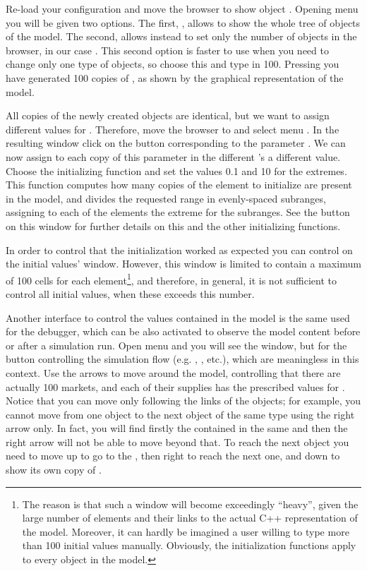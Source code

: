 \documentclass [11pt,a4paper] {book}
\def\LsD{{L\kern-.2337em\lower-.58ex\hbox{S}\kern-.181em\lower-.2ex\hbox{D}}\xspace}
\begin{document}
Re-load your configuration and move the browser to show object . Opening menu  you will be given two options. The first, , allows to show the whole tree of objects of the model. The second,  allows instead to set only the number of objects in the browser, in our case . This second option is faster to use when you need to change only one type of objects, so choose this and type in 100. Pressing  you have generated 100 copies of , as shown by the \menu{\LsD Model Structure} graphical representation of the model.

All copies of the newly created objects are identical, but we want to assign different values for . Therefore, move the browser to  and select menu . In the resulting window click on the  button corresponding to the parameter . We can now assign to each copy of this parameter in the different 's a different value. Choose the initializing function  and set the values 0.1 and 10 for the extremes. This function computes how many copies of the element to initialize are present in the model, and divides the requested range in evenly-spaced subranges, assigning to each of the elements the extreme for the subranges. See the  button on this window for further details on this and the other initializing functions.

In order to control that the initialization worked as expected you can control on the initial values' window. However, this window is limited to contain a maximum of 100 cells for each element\footnote{The reason is that such a window will become exceedingly ``heavy'', given the large number of elements and their links to the actual C++ representation of the model. Moreover, it can hardly be imagined a user willing to type more than 100 initial values manually. Obviously, the initialization functions apply to every object in the model.}, and therefore, in general, it is not sufficient to control all initial values, when these exceeds this number.

Another interface to control the values contained in the model is the same used for the debugger, which can be also activated to observe the model content before or after a simulation run. Open menu  and you will see the  window, but for the button controlling the simulation flow (e.g. , , etc.), which are meaningless in this context. Use the arrows to move around the model, controlling that there are actually 100 markets, and each of their supplies has the prescribed values for . Notice that you can move only following the links of the objects; for example, you cannot move from one object  to the next object of the same type using the right arrow only. In fact, you will find firstly the  contained in the same  and then the right arrow will not be able to move beyond that. To reach the next object  you need to move up to go to the , then right to reach the next one, and down to show its own copy of .
\end{document}
